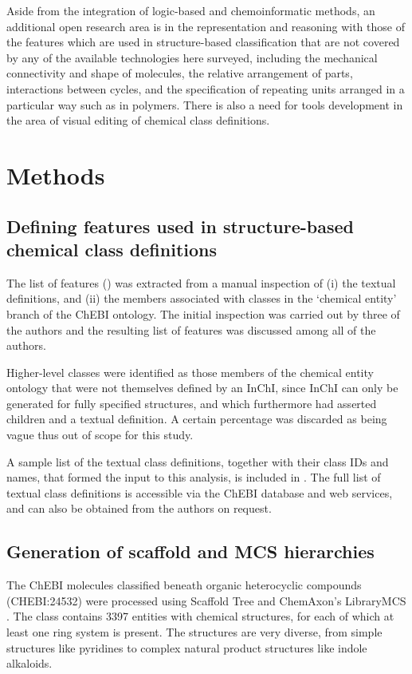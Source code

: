 \documentclass[10pt]{bmc_article}
\newenvironment{bmcformat}{\baselineskip20pt\sloppy\setboolean{publ}{false}}{\baselineskip20pt\sloppy}
\begin{document}
\begin{bmcformat}
Aside from the integration of logic-based and chemoinformatic methods, an additional open research area is in the representation and reasoning with those of the features which are used in structure-based classification that are not covered by any of the available technologies here surveyed, including the mechanical connectivity and shape of molecules, the relative arrangement of parts, interactions between cycles, and the specification of repeating units arranged in a particular way such as in polymers. There is also a need for tools development in the area of visual editing of chemical class definitions. 


\section*{Methods}

\subsection*{Defining features used in structure-based chemical class definitions}

The list of features (\textit{}) was extracted from a manual inspection of (i) the textual definitions, and (ii) the members associated with classes in the `chemical entity' branch of the ChEBI ontology. The initial inspection was carried out by three of the authors and the resulting list of features was discussed among all of the authors. 

Higher-level classes were identified as those members of the chemical entity ontology that were not themselves defined by an InChI, since InChI can only be generated for fully specified structures, and which furthermore had asserted children and a textual definition.  A certain percentage was discarded as being vague thus out of scope for this study. 

A sample list of the textual class definitions, together with their class IDs and names, that formed the input to this analysis, is included in \textit{}. The full list of textual class definitions is accessible via the ChEBI database and web services, and can also be obtained from the authors on request. 

\subsection*{Generation of scaffold and MCS hierarchies}

The ChEBI molecules classified beneath organic heterocyclic compounds (CHEBI:24532) were processed using Scaffold Tree \cite{Schuffenhauer2007} and ChemAxon's LibraryMCS \cite{librarymcs}. The class contains 3397 entities with chemical structures, for each of which at least one ring system is present. The structures are very diverse, from simple structures like pyridines to complex natural product structures like indole alkaloids. 


\end{bmcformat}
\end{document}
